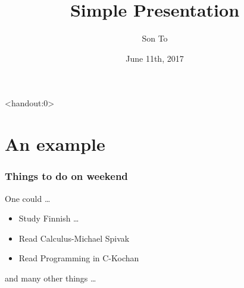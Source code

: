 \documentclass[10pt]{beamer}
\title{Simple Presentation}
\author[Intro]{Son To}
\institute{Kiltakellari ravintola}
\date{June 11th, 2017}
\begin{document}
  \begin{frame}<handout:0>
    \titlepage
  \end{frame}

  \section{An example}

  \begin{frame}
    \frametitle{Things to do on weekend}
    \begin{block}{One could \ldots}
      \begin{itemize}
        \item Study Finnish \ldots \pause
        \item Read Calculus-Michael Spivak \pause
        \item Read Programming in C-Kochan \pause
      \end{itemize}
    \end{block}
    and many other things \ldots
  \end{frame}
\end{document}
